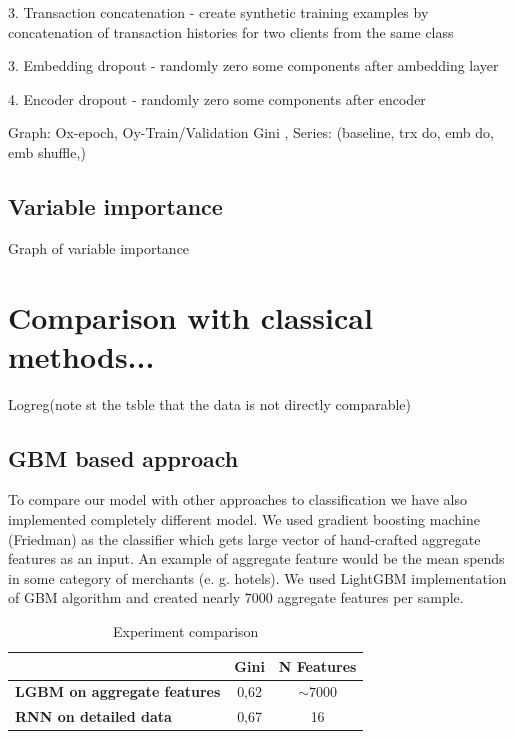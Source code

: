\documentclass{sigkddExp}
\begin{document}
3. Transaction concatenation - create synthetic training examples by concatenation of 
transaction histories for two clients from the same class

3. Embedding dropout - randomly zero some components after ambedding layer

4. Encoder dropout - randomly zero some components after encoder




Graph: Ox-epoch, Oy-Train/Validation Gini , Series: (baseline, trx do, emb do, emb shuffle,) 


\subsection{Variable importance}


Graph of variable importance


\section{Comparison with classical methods...}

Logreg(note st the tsble that the data is not directly comparable)

\subsection{GBM based approach}

To compare our model with other approaches to classification we have also implemented completely different model. We used gradient boosting machine (Friedman\cite{friedman2001greedy}) as the classifier which gets large vector of hand-crafted aggregate features as an input. An example of aggregate feature would be the mean spends in some category of merchants (e. g. hotels).
We used LightGBM\cite{Ke2017LightGBMAH} implementation of GBM algorithm and created nearly 7000 aggregate features per sample.

\begin{table}
\caption{Experiment comparison}
\begin{tabular}{ | l | c | c | }
\hline
& \textbf{Gini} & \textbf{N Features} \\
\hline
\textbf{LGBM on aggregate features} & 0,62 & $\sim7000$ \\
\textbf{RNN on detailed data} & 0,67 & 16 \\
\hline
\end{tabular}
\label{tab2}
\end{table}
\end{document}
